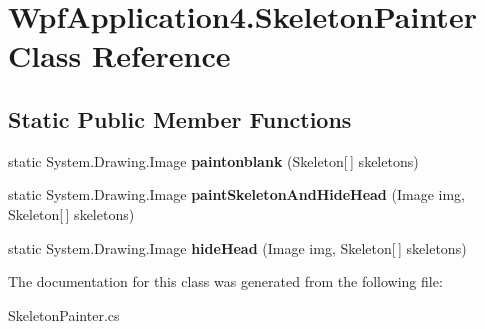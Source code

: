 \hypertarget{class_wpf_application4_1_1_skeleton_painter}{\section{Wpf\-Application4.\-Skeleton\-Painter Class Reference}
\label{class_wpf_application4_1_1_skeleton_painter}
}
\subsection*{Static Public Member Functions}
\begin{DoxyCompactItemize}
\item 
\hypertarget{class_wpf_application4_1_1_skeleton_painter_affdcdf43e92a587dfdbcd5454ba07288}{static System.\-Drawing.\-Image {\bfseries paintonblank} (Skeleton\mbox{[}$\,$\mbox{]} skeletons)}\label{class_wpf_application4_1_1_skeleton_painter_affdcdf43e92a587dfdbcd5454ba07288}

\item 
\hypertarget{class_wpf_application4_1_1_skeleton_painter_a4279307e9cf5b2670cb4dfcdfabb78e6}{static System.\-Drawing.\-Image {\bfseries paint\-Skeleton\-And\-Hide\-Head} (Image img, Skeleton\mbox{[}$\,$\mbox{]} skeletons)}\label{class_wpf_application4_1_1_skeleton_painter_a4279307e9cf5b2670cb4dfcdfabb78e6}

\item 
\hypertarget{class_wpf_application4_1_1_skeleton_painter_a8193fdcba750cc1bece9016ff82381ad}{static System.\-Drawing.\-Image {\bfseries hide\-Head} (Image img, Skeleton\mbox{[}$\,$\mbox{]} skeletons)}\label{class_wpf_application4_1_1_skeleton_painter_a8193fdcba750cc1bece9016ff82381ad}

\end{DoxyCompactItemize}


The documentation for this class was generated from the following file\-:\begin{DoxyCompactItemize}
\item 
Skeleton\-Painter.\-cs\end{DoxyCompactItemize}

